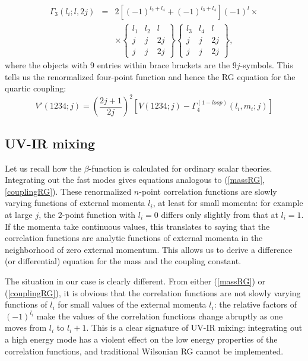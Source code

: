 \documentclass[a4paper,12pt]{article}
\numberwithin{equation}{section}
\begin{document}
\begin{eqnarray}
\Gamma_3(l_i;l,2j) &=&2[(-1)^{l_2 + l_4} + (-1)^{l_3 + l_4}](-1)^l
\times \nonumber \\
&& \times \left\{ \begin{array}{ccc}
           l_1 & l_2 & l \\
	   j   & j   & 2j\\
           j   & j   & 2j
	 \end{array}\right\} \left\{ \begin{array}{ccc}
				        l_3 & l_4 & l \\
					j   & j   & 2j\\
                                        j   & j   & 2j
			  	      \end{array} \right\},
\end{eqnarray}
where the objects with 9 entries within brace brackets are the
$9j$-symbols. This tells us the renormalized four-point function and
hence the RG equation for the quartic coupling:
\begin{equation} 
V'(1234;j)=\left(\frac{2j+1}{2j}\right)^2 \left[V(1234;j) -
\Gamma^{(1-loop)}_4 (l_i,m_i;j) \right]  
\label{couplingRG}
\end{equation}

\subsection{UV-IR mixing}
Let us recall how the $\beta$-function is calculated for ordinary
scalar theories. Integrating out the fast modes gives equations
analogous to (\ref{massRG},\ref{couplingRG}). These renormalized
$n$-point correlation functions are slowly varying functions of
external momenta $l_i$, at least for small momenta: for example at
large $j$, the 2-point function with $l_i=0$ differs only slightly
from that at $l_i=1$. If the momenta take continuous values, this
translates to saying that the correlation functions are analytic
functions of external momenta in the neighborhood of zero external
momentum. This allows us to derive a difference (or differential)
equation for the mass and the coupling constant.

The situation in our case is clearly different. From either
(\ref{massRG}) or (\ref{couplingRG}), it is obvious that the
correlation functions are not slowly varying functions of $l_i$ for
small values of the external momenta $l_i$: the relative factors of
$(-1)^{l_i}$ make the values of the correlation functions change
abruptly as one moves from $l_i$ to $l_i +1$. This is a clear
signature of UV-IR mixing: integrating out a high energy mode has a
violent effect on the low energy properties of the correlation
functions, and traditional Wilsonian RG cannot be implemented.
\end{document}
